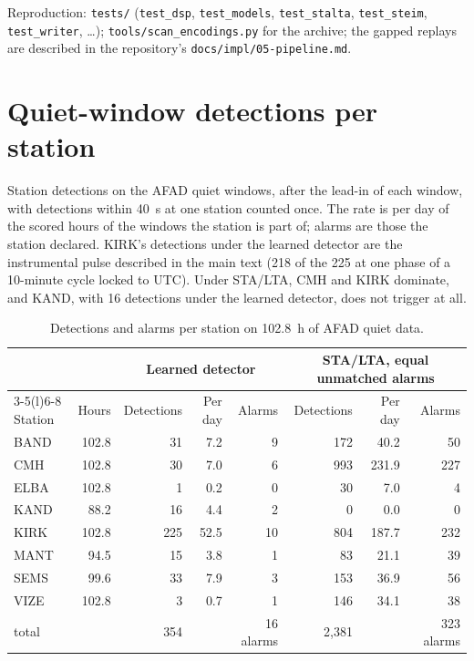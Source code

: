 \documentclass[11pt,a4paper]{article}
\newcommand{\stalta}{STA/LTA}
\newcommand{\tool}[1]{\nolinkurl{#1}}
\begin{document}
\noindent Reproduction: \tool{tests/} (\tool{test_dsp}, \tool{test_models},
\tool{test_stalta}, \tool{test_steim}, \tool{test_writer}, \ldots);
\tool{tools/scan_encodings.py} for the archive; the gapped replays are
described in the repository's \tool{docs/impl/05-pipeline.md}.

\clearpage
\section{Quiet-window detections per station}\label{s:perstation}

Station detections on the AFAD quiet windows, after the lead-in of each
window, with detections within 40~s at one station counted once. The rate is
per day of the scored hours of the windows the station is part of; alarms are
those the station declared. KIRK's detections under the learned detector are
the instrumental pulse described in the main text (218 of the 225 at one phase
of a 10-minute cycle locked to UTC). Under \stalta{}, CMH and KIRK dominate,
and KAND, with 16 detections under the learned detector, does not trigger at
all.

\begin{table}[htbp]
  \centering\small
  \caption{Detections and alarms per station on 102.8~h of AFAD quiet data.}\label{t:perstation}
  \begin{tabular}{@{}lrrrrrrr@{}}
    \toprule
    & & \multicolumn{3}{c}{Learned detector} & \multicolumn{3}{c}{\stalta{}, equal unmatched alarms} \\
    \cmidrule(lr){3-5}\cmidrule(l){6-8}
    Station & Hours & Detections & Per day & Alarms & Detections & Per day & Alarms \\
    \midrule
    BAND & 102.8 & 31  & 7.2  & 9  & 172 & 40.2  & 50  \\
    CMH  & 102.8 & 30  & 7.0  & 6  & 993 & 231.9 & 227 \\
    ELBA & 102.8 & 1   & 0.2  & 0  & 30  & 7.0   & 4   \\
    KAND & 88.2  & 16  & 4.4  & 2  & 0   & 0.0   & 0   \\
    KIRK & 102.8 & 225 & 52.5 & 10 & 804 & 187.7 & 232 \\
    MANT & 94.5  & 15  & 3.8  & 1  & 83  & 21.1  & 39  \\
    SEMS & 99.6  & 33  & 7.9  & 3  & 153 & 36.9  & 56  \\
    VIZE & 102.8 & 3   & 0.7  & 1  & 146 & 34.1  & 38  \\
    \midrule
    total & & 354 & & 16 alarms & 2{,}381 & & 323 alarms \\
    \bottomrule
  \end{tabular}
\end{table}
\end{document}
